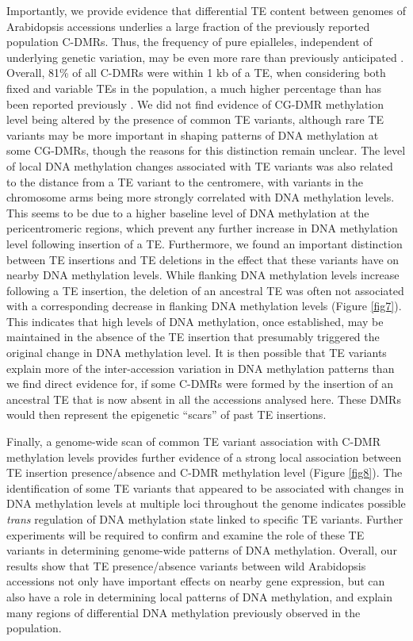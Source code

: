 \documentclass[12pt]{article}
\begin{document}
Importantly, we provide evidence that differential TE content between
genomes of Arabidopsis accessions underlies a large fraction of the
previously reported population C-DMRs. Thus, the frequency of pure
epialleles, independent of underlying genetic variation, may be even
more rare than previously anticipated \cite{Richards:2006br}. Overall,
81\% of all C-DMRs were within 1 kb of a TE, when considering both fixed
and variable TEs in the population, a much higher percentage than has
been reported previously \cite{Schmitz:2013iu, Quadrana:2016bi}. We did
not find evidence of CG-DMR methylation level being altered by the
presence of common TE variants, although rare TE variants may be more
important in shaping patterns of DNA methylation at some CG-DMRs, though
the reasons for this distinction remain unclear. The level of local DNA
methylation changes associated with TE variants was also related to the
distance from a TE variant to the centromere, with variants in the
chromosome arms being more strongly correlated with DNA methylation
levels. This seems to be due to a higher baseline level of DNA
methylation at the pericentromeric regions, which prevent any further
increase in DNA methylation level following insertion of a TE.
Furthermore, we found an important distinction between TE insertions and
TE deletions in the effect that these variants have on nearby DNA
methylation levels. While flanking DNA methylation levels increase
following a TE insertion, the deletion of an ancestral TE was often not
associated with a corresponding decrease in flanking DNA methylation
levels (Figure \ref{fig7}). This indicates that high levels of DNA methylation,
once established, may be maintained in the absence of the TE insertion
that presumably triggered the original change in DNA methylation level.
It is then possible that TE variants explain more of the inter-accession
variation in DNA methylation patterns than we find direct evidence for,
if some C-DMRs were formed by the insertion of an ancestral TE that is
now absent in all the accessions analysed here. These DMRs would then
represent the epigenetic ``scars'' of past TE insertions.

Finally, a genome-wide scan of common TE variant association with C-DMR
methylation levels provides further evidence of a strong local
association between TE insertion presence/absence and C-DMR methylation
level (Figure \ref{fig8}). The identification of some TE variants that appeared
to be associated with changes in DNA methylation levels at multiple loci
throughout the genome indicates possible \emph{trans} regulation of DNA
methylation state linked to specific TE variants. Further experiments
will be required to confirm and examine the role of these TE variants in
determining genome-wide patterns of DNA methylation. Overall, our
results show that TE presence/absence variants between wild Arabidopsis
accessions not only have important effects on nearby gene expression,
but can also have a role in determining local patterns of DNA
methylation, and explain many regions of differential DNA methylation
previously observed in the population.
\end{document}

